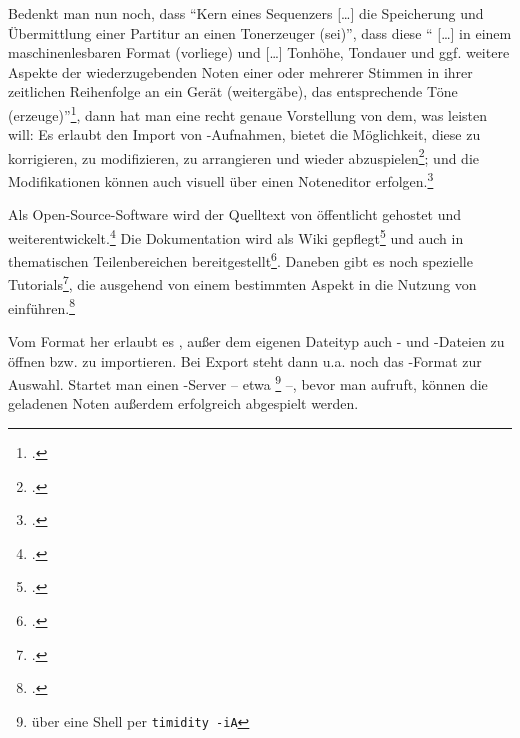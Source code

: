 Bedenkt man nun noch, dass \enquote{Kern eines Sequenzers [\ldots] die
Speicherung und Über\-mitt\-lung einer Partitur an einen Tonerzeuger (sei)},
dass diese \enquote{ [\ldots] in einem maschinenlesbaren Format (vorliege) und
[\ldots] Tonhöhe, Tondauer und ggf. weitere Aspekte der wiederzugebenden Noten
einer oder mehrerer Stimmen in ihrer zeitlichen Reihenfolge an ein Gerät
(weitergäbe), das entsprechende Töne (erzeuge)}\footcite[vgl.][\nopage
wp]{WpedSequencer2018a}, dann hat man eine recht genaue Vorstellung von dem, was
 leisten will: Es erlaubt den Import von -Aufnahmen,
bietet die Möglichkeit, diese zu korrigieren, zu modifizieren, zu arrangieren
und wieder abzuspielen\footcite[vgl.][\nopage wp]{Rosegarden2019c}; und die
Modifikationen können auch visuell über einen Noteneditor
erfolgen.\footcite[vgl.][\nopage wp]{Rosegarden2019d}

Als Open-Source-Software wird der Quelltext von  öffentlicht
gehostet und weiterentwickelt.\footcite[vgl.][\nopage wp]{Rosegarden2019e} Die
Dokumentation wird als Wiki gepflegt\footcite[vgl.][\nopage wp]{Rosegarden2019c}
und auch in thematischen Teilenbereichen bereitgestellt\footcite[vgl.][\nopage
wp]{Rosegarden2019d}. Daneben gibt es noch spezielle
Tutorials\footcite[vgl.][\nopage wp]{Rosegarden2019b}, die ausgehend von einem
bestimmten Aspekt in die Nutzung von 
einführen.\footcite[vgl.][\nopage wp]{McIntyre2008a}

Vom Format her erlaubt es , außer dem eigenen Dateityp auch
- und -Dateien zu öffnen bzw. zu importieren. Bei Export
steht dann u.a. noch das -Format zur Auswahl. Startet man einen
-Server -- etwa \footnote{über eine Shell per
\texttt{timidity -iA}} --, bevor man  aufruft, können die
geladenen Noten außerdem erfolgreich abgespielt werden.
%
